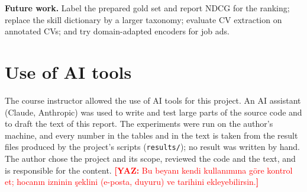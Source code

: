 \documentclass[runningheads]{llncs}
\newcommand{\yaz}[1]{\textcolor{red}{\textbf{[YAZ:} #1\textbf{]}}}
\begin{document}
\textbf{Future work.} Label the prepared gold set and report NDCG for the ranking; replace the skill
dictionary by a larger taxonomy; evaluate CV extraction on annotated CVs; and try domain-adapted
encoders for job ads.

\section*{Use of AI tools}
The course instructor allowed the use of AI tools for this project. An AI assistant (Claude, Anthropic)
was used to write and test large parts of the source code and to draft the text of this report. The
experiments were run on the author's machine, and every number in the tables and in the text is taken
from the result files produced by the project's scripts (\texttt{results/}); no result was written by
hand. The author chose the project and its scope, reviewed the code and the text, and is responsible
for the content. \yaz{Bu beyanı kendi kullanımına göre kontrol et; hocanın izninin şeklini (e-posta,
duyuru) ve tarihini ekleyebilirsin.}



\end{document}
